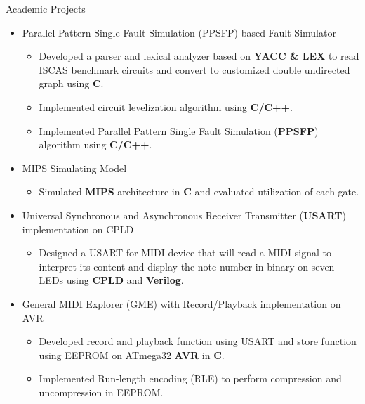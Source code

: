\documentclass{resume} %
\begin{document}

\begin{rSection}{Academic Projects} 

\begin{itemize}\itemsep -2pt

\item Parallel Pattern Single Fault Simulation (PPSFP) based Fault Simulator
    \begin{itemize}\itemsep -3pt
    \item Developed a parser and lexical analyzer based on \textbf{YACC \& LEX} to read ISCAS benchmark circuits and convert to customized double undirected graph using \textbf{C}.
    \item Implemented circuit levelization algorithm using \textbf{C/C++}.
    \item Implemented Parallel Pattern Single Fault Simulation (\textbf{PPSFP}) algorithm using \textbf{C/C++}.
    \end{itemize}

\item MIPS Simulating Model
    \begin{itemize}\itemsep -3pt
    \item Simulated \textbf{MIPS} architecture in \textbf{C} and evaluated utilization of each gate.
    \end{itemize}

\item Universal Synchronous and Asynchronous Receiver Transmitter (\textbf{USART}) implementation on CPLD
    \begin{itemize}\itemsep -3pt
    \item Designed a USART for MIDI device that will read a MIDI signal to interpret its content and display the note number in binary on seven LEDs using \textbf{CPLD} and \textbf{Verilog}.
    \end{itemize}

\item  General MIDI Explorer (GME) with Record/Playback implementation on AVR
    \begin{itemize}\itemsep -3pt
    \item Developed record and playback function using USART and store function using EEPROM on ATmega32 \textbf{AVR} in \textbf{C}.
    \item Implemented Run-length encoding (RLE) to perform compression and uncompression in EEPROM.
    \end{itemize}
\end{itemize}

\end{rSection}
\end{document}
